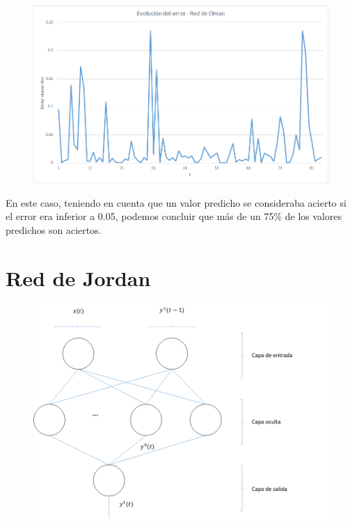 \documentclass[a4paper,11pt]{article}
\begin{document}
\begin{figure}[!htbp]
	\centering
	\includegraphics[width=1.0\textwidth]{red_elman_error.png}
\end{figure}

En este caso, teniendo en cuenta que un valor predicho se consideraba acierto si el error era inferior a 0.05, podemos concluir que más de un 75\% de los valores predichos son aciertos.

\newpage
\section{Red de Jordan}

\begin{figure}[!htbp]
	\centering
	\includegraphics[width=1.0\textwidth]{red_jordan.png}
\end{figure}
\end{document}
